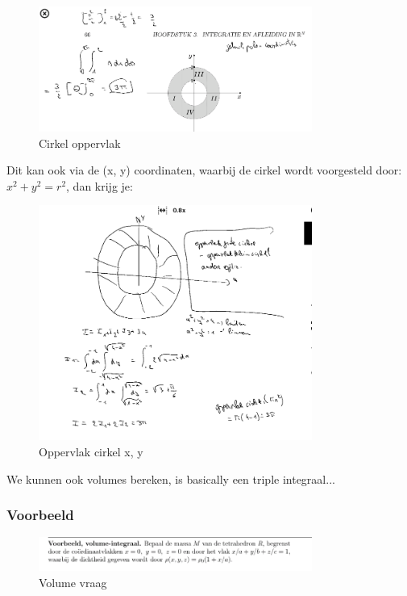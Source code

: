 \documentclass[a4paper]{report}
\begin{document}
\begin{figure}[H]
	\centering
	\includegraphics[width=0.8\textwidth]{assets/circkel_oppervlak.png}
	\caption{Cirkel oppervlak}
	\label{fig:circkel_oppervlak}
\end{figure}

Dit kan ook via de (x, y) coordinaten, waarbij de cirkel wordt voorgesteld door: $x^2 + y^2 = r^2$, dan krijg je:


\begin{figure}[H]
	\centering
	\includegraphics[width=0.8\textwidth]{assets/oppervlak_cirkel_x_y.png}
	\caption{Oppervlak cirkel x, y}
	\label{fig:oppervlak_cirkel_x_y}
\end{figure}

We kunnen ook volumes bereken, is basically een triple integraal...

\subsubsection{Voorbeeld}


\begin{figure}[H]
	\centering
	\includegraphics[width=0.8\textwidth]{assets/volume_vraag.png}
	\caption{Volume vraag}
	\label{fig:volume_vraag}
\end{figure}
\end{document}
